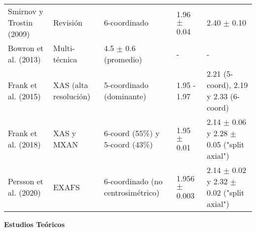 \begin{sidewaystable}
{\begin{tabular}{@{}lllll@{}}
    Smirnov y Trostin (2009)& Revisión                & 6-coordinado                           & 1.96 $\pm$ 0.04                      & 2.40 $\pm$ 0.10                                 \\
    Bowron et al. (2013)    & Multi-técnica           & 4.5 $\pm$ 0.6 (promedio)               & -                                    & -                                               \\
    Frank et al. (2015)     & XAS (alta resolución)   & 5-coordinado (dominante)               & 1.95 - 1.97                          & 2.21 (5-coord), 2.19 y 2.33 (6-coord)           \\
    Frank et al. (2018)     & XAS y MXAN              & 6-coord (55\%) y 5-coord (43\%)        & 1.95 $\pm$ 0.01                      & 2.14 $\pm$ 0.06 y 2.28 $\pm$ 0.05 ("split axial") \\
    Persson et al. (2020)   & EXAFS                   & 6-coordinado (no centrosimétrico)      & 1.956 $\pm$ 0.003                    & 2.14 $\pm$ 0.02 y 2.32 $\pm$ 0.02 ("split axial") \\
    \bottomrule
    \end{tabular}

    \vspace{8mm} %

    \textbf{Estudios Teóricos}
    \vspace{2mm} %

}
\end{sidewaystable}
